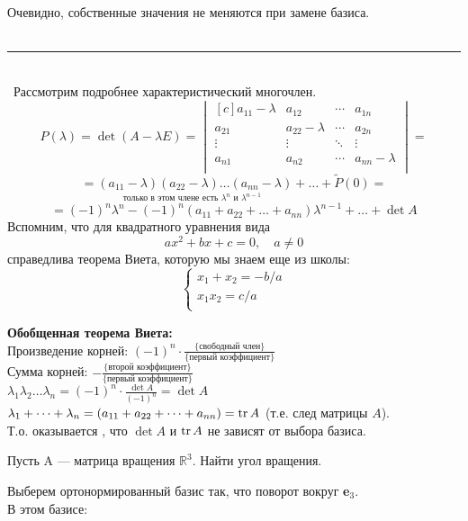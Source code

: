 Очевидно, собственные значения не меняются при замене базиса.
~\\\
\hrule
~\\\
Рассмотрим подробнее характеристический многочлен.
$$
P(\lambda)=\det (A-\lambda E)=
\begin{vmatrix*}[c]
 a_{11}-\lambda & a_{12} & \cdots & a_{1n}\\
 a_{21} & a_{22}-\lambda & \cdots & a_{2n}\\
 \vdots & \vdots & \ddots & \vdots \\
 a_{n1} & a_{n2} & \cdots & a_{nn}-\lambda\\
\end{vmatrix*}
=
$$
$$
=\underset{\text{только в этом члене есть $\lambda^{n}$ и $\lambda^{n-1}$ }}
{( a_{11}-\lambda)(a_{22}-\lambda)\dots ( a_{nn}-\lambda)} + \dots + \tilde P(0)=
$$
$$
=(-1)^{n}\lambda^{n}-(-1)^{n}( a_{11}+a_{22}+\dots+a_{nn})\lambda^{n-1}+\dots+\det A
$$
Вспомним, что для квадратного уравнения вида 
$$ax^{2}+bx+c=0,\quad a\neq 0$$
справедлива теорема Виета, которую мы знаем еще из школы:
$$\left\{
\begin{aligned}
x_{1}+x_{2}=-b/a\\
x_{1}x_{2}=c/a\\
\end{aligned}
\right.$$

\textbf{Обобщенная теорема Виета:}\\
Произведение корней: $(-1)^{n}\cdot \frac{\{ \text{свободный член}\}}{\{ \text{первый коэффициент}\}}$\\
Сумма корней: $-\frac{\{ \text{второй коэффициент}\}}{\{ \text{первый коэффициент}\}}$\\
$\lambda_{1}\lambda_{2}\dots \lambda_{n}=(-1)^{n}\cdot \frac{\det A}{(-1)^{n}}=\det A$\\
$\lambda_{1}+ \dots + \lambda_{n}=(a_{11}+a_{22}+\dots+a_{nn})=\operatorname{\mathop{tr}} A$ (т.е. след матрицы $A$).\\
Т.о. оказывается , что $\det A$ и $\operatorname{\mathop{tr}} A$ не зависят от выбора базиса.
\begin{prim}
Пусть A --- матрица вращения $\mathbb{R}^{3}$. Найти угол вращения.
\end{prim}
Выберем ортонормированный базис так, что поворот вокруг \textbf{e$_{3}$}.\\
В этом базисе: